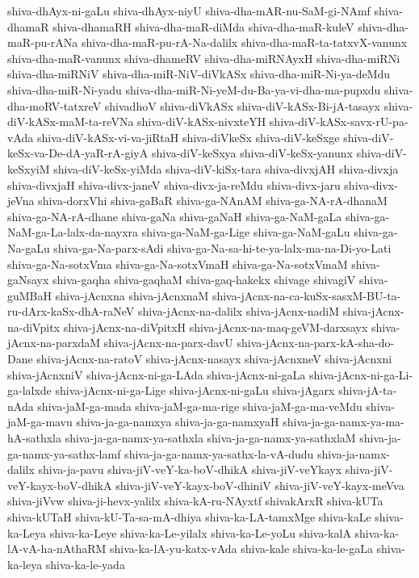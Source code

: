 {shiva-dhAyx-ni-gaLu
shiva-dhAyx-niyU
shiva-dha-mAR-nu-SaM-gi-NAmf
shiva-dhamaR
shiva-dhamaRH
shiva-dha-maR-diMda
shiva-dha-maR-kuleV
shiva-dha-maR-pu-rANa
shiva-dha-maR-pu-rA-Na-dalilx
shiva-dha-maR-ta-tatxvX-vanunx
shiva-dha-maR-vanunx
shiva-dhameRV
shiva-dha-miRNAyxH
shiva-dha-miRNi
shiva-dha-miRNiV
shiva-dha-miR-NiV-diVkASx
shiva-dha-miR-Ni-ya-deMdu
shiva-dha-miR-Ni-yadu
shiva-dha-miR-Ni-yeM-du-Ba-ya-vi-dha-ma-pupxdu
shiva-dha-moRV-tatxreV
shivadhoV
shiva-diVkASx
shiva-diV-kASx-Bi-jA-tasayx
shiva-diV-kASx-maM-ta-reVNa
shiva-diV-kASx-nivxteYH
shiva-diV-kASx-savx-rU-pa-vAda
shiva-diV-kASx-vi-va-jiRtaH
shiva-diVkeSx
shiva-diV-keSxge
shiva-diV-keSx-va-De-dA-yaR-rA-giyA
shiva-diV-keSxya
shiva-diV-keSx-yanunx
shiva-diV-keSxyiM
shiva-diV-keSx-yiMda
shiva-diV-kiSx-tara
shiva-divxjAH
shiva-divxja
shiva-divxjaH
shiva-divx-janeV
shiva-divx-ja-reMdu
shiva-divx-jaru
shiva-divx-jeVna
shiva-dorxVhi
shiva-gaBaR
shiva-ga-NAnAM
shiva-ga-NA-rA-dhanaM
shiva-ga-NA-rA-dhane
shiva-gaNa
shiva-gaNaH
shiva-ga-NaM-gaLa
shiva-ga-NaM-ga-La-lalx-da-nayxra
shiva-ga-NaM-ga-Lige
shiva-ga-NaM-gaLu
shiva-ga-Na-gaLu
shiva-ga-Na-parx-sAdi
shiva-ga-Na-sa-hi-te-ya-lalx-ma-na-Di-yo-Lati
shiva-ga-Na-sotxVma
shiva-ga-Na-sotxVmaH
shiva-ga-Na-sotxVmaM
shiva-gaNsayx
shiva-gaqha
shiva-gaqhaM
shiva-gaq-hakekx
shivage
shivagiV
shiva-guMBaH
shiva-jAcnxna
shiva-jAcnxnaM
shiva-jAcnx-na-ca-kuSx-sasxM-BU-ta-ru-dArx-kaSx-dhA-raNeV
shiva-jAcnx-na-dalilx
shiva-jAcnx-nadiM
shiva-jAcnx-na-diVpitx
shiva-jAcnx-na-diVpitxH
shiva-jAcnx-na-maq-geVM-darxsayx
shiva-jAcnx-na-parxdaM
shiva-jAcnx-na-parx-davU
shiva-jAcnx-na-parx-kA-sha-do-Dane
shiva-jAcnx-na-ratoV
shiva-jAcnx-nasayx
shiva-jAcnxneV
shiva-jAcnxni
shiva-jAcnxniV
shiva-jAcnx-ni-ga-LAda
shiva-jAcnx-ni-gaLa
shiva-jAcnx-ni-ga-Li-ga-lalxde
shiva-jAcnx-ni-ga-Lige
shiva-jAcnx-ni-gaLu
shiva-jAgarx
shiva-jA-ta-nAda
shiva-jaM-ga-mada
shiva-jaM-ga-ma-rige
shiva-jaM-ga-ma-veMdu
shiva-jaM-ga-mavu
shiva-ja-ga-namxya
shiva-ja-ga-namxyaH
shiva-ja-ga-namx-ya-ma-hA-sathxla
shiva-ja-ga-namx-ya-sathxla
shiva-ja-ga-namx-ya-sathxlaM
shiva-ja-ga-namx-ya-sathx-lamf
shiva-ja-ga-namx-ya-sathx-la-vA-dudu
shiva-ja-namx-dalilx
shiva-ja-pavu
shiva-jiV-veY-ka-boV-dhikA
shiva-jiV-veYkayx
shiva-jiV-veY-kayx-boV-dhikA
shiva-jiV-veY-kayx-boV-dhiniV
shiva-jiV-veY-kayx-meVva
shiva-jiVvw
shiva-ji-hevx-yalilx
shiva-kA-ru-NAyxtf
shivakArxR
shiva-kUTa
shiva-kUTaH
shiva-kU-Ta-sa-mA-dhiya
shiva-ka-LA-tamxMge
shiva-kaLe
shiva-ka-Leya
shiva-ka-Leye
shiva-ka-Le-yilalx
shiva-ka-Le-yoLu
shiva-kalA
shiva-ka-lA-vA-ha-nAthaRM
shiva-ka-lA-yu-katx-vAda
shiva-kale
shiva-ka-le-gaLa
shiva-ka-leya
shiva-ka-le-yada
}

